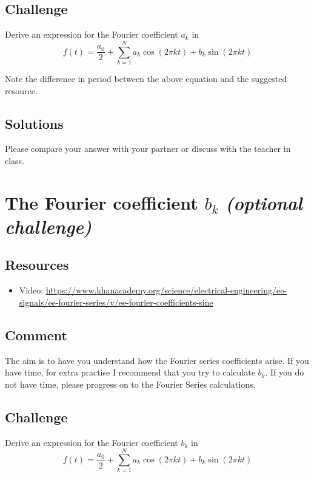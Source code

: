 \subsection*{Challenge}
Derive an expression for the Fourier coefficient $a_k$ in
\begin{equation}
    f(t) = \frac{a_0}{2} + \sum_{k=1}^{N} a_k \cos(2 \pi k t) + b_k \sin(2 \pi k t)
\end{equation}

Note the difference in period between the above equation and the suggested resource.

\subsection*{Solutions}
Please compare your answer with your partner or discuss with the teacher in class.




\newpage
\section{The Fourier coefficient $b_k$ \emph{(optional challenge)}}

\subsection*{Resources}
\begin{itemize}
    \item Video: \url{https://www.khanacademy.org/science/electrical-engineering/ee-signals/ee-fourier-series/v/ee-fourier-coefficients-sine}
\end{itemize}

\subsection*{Comment}
The aim is to have you understand how the Fourier series coefficients arise. If you have time, for extra practise I recommend that you try to calculate $b_k$. If you do not have time, please progress on to the Fourier Series calculations.

\subsection*{Challenge}
Derive an expression for the Fourier coefficient $b_k$ in
\begin{equation}
    f(t) = \frac{a_0}{2} + \sum_{k=1}^{N} a_k \cos(2 \pi k t) + b_k \sin(2 \pi k t)
\end{equation}

